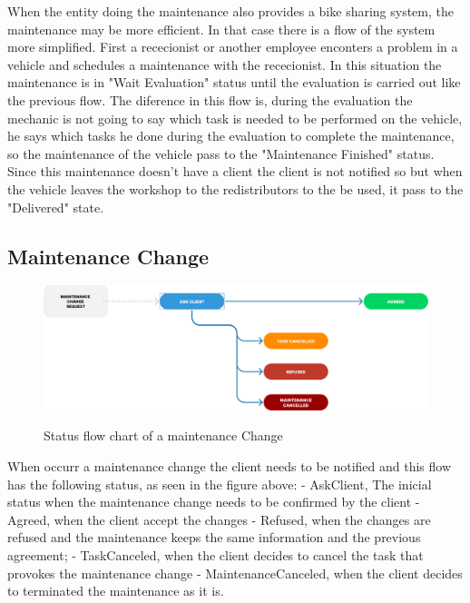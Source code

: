 When the entity doing the maintenance also provides a bike sharing system, the maintenance may be more efficient.
In that case there is a flow of the system more simplified.
First a rececionist or another employee enconters a problem in a vehicle and schedules a maintenance with the rececionist. In this situation the maintenance is in "Wait Evaluation" status until the evaluation is carried out like the previous flow.
The diference in this flow is, during the evaluation the mechanic is not going to say which task is needed to be performed on the vehicle, he says which tasks he done during the evaluation to complete the maintenance, so the maintenance of the vehicle pass to the "Maintenance Finished" status.
Since this maintenance doesn't have a client the client is not notified so but when the vehicle leaves the workshop to the redistributors to the be used, it pass to the "Delivered" state.  


\subsection{Maintenance Change} 


\begin{figure}[h]
  \caption{Status flow chart of a maintenance Change}
  \centering
  \includegraphics[width=\textwidth]{figs/Status/MaintenanceChange/StatusDiagram}
  \label{fig:figure2}
\end{figure}


When occurr a maintenance change the client needs to be notified and this flow has the following status, as seen in the figure above:
- AskClient, The inicial status when the maintenance change needs to be confirmed by the client
- Agreed, when the client accept the changes
- Refused, when the changes are refused and the maintenance keeps the same information and the previous agreement; 
- TaskCanceled, when the client decides to cancel the task that provokes the maintenance change
- MaintenanceCanceled, when the client decides to terminated the maintenance as it is.



